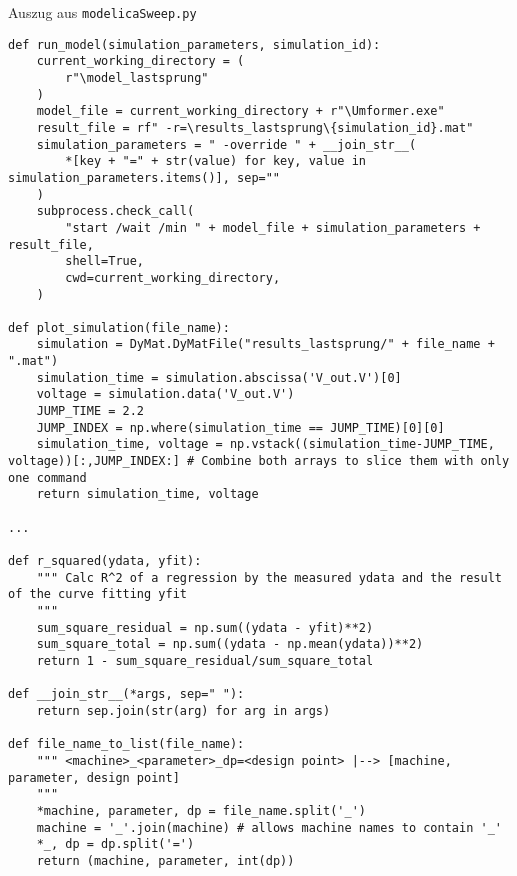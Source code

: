 \begingroup
\captionsetup{type=listing}
\caption{Auszug aus \texttt{modelicaSweep.py}\label{lst:ModelicaSweep}}
\begin{verbatim}
def run_model(simulation_parameters, simulation_id):
    current_working_directory = (
        r"\model_lastsprung"
    )
    model_file = current_working_directory + r"\Umformer.exe"
    result_file = rf" -r=\results_lastsprung\{simulation_id}.mat"
    simulation_parameters = " -override " + __join_str__(
        *[key + "=" + str(value) for key, value in simulation_parameters.items()], sep=""
    )
    subprocess.check_call(
        "start /wait /min " + model_file + simulation_parameters + result_file,
        shell=True,
        cwd=current_working_directory,
    )

def plot_simulation(file_name):
    simulation = DyMat.DyMatFile("results_lastsprung/" + file_name + ".mat")
    simulation_time = simulation.abscissa('V_out.V')[0]
    voltage = simulation.data('V_out.V')
    JUMP_TIME = 2.2
    JUMP_INDEX = np.where(simulation_time == JUMP_TIME)[0][0]
    simulation_time, voltage = np.vstack((simulation_time-JUMP_TIME, voltage))[:,JUMP_INDEX:] # Combine both arrays to slice them with only one command
    return simulation_time, voltage

...
    
def r_squared(ydata, yfit):
    """ Calc R^2 of a regression by the measured ydata and the result of the curve fitting yfit
    """
    sum_square_residual = np.sum((ydata - yfit)**2)
    sum_square_total = np.sum((ydata - np.mean(ydata))**2)
    return 1 - sum_square_residual/sum_square_total

def __join_str__(*args, sep=" "):
    return sep.join(str(arg) for arg in args)

def file_name_to_list(file_name):
    """ <machine>_<parameter>_dp=<design point> |--> [machine, parameter, design point]
    """
    *machine, parameter, dp = file_name.split('_')
    machine = '_'.join(machine) # allows machine names to contain '_'
    *_, dp = dp.split('=')
    return (machine, parameter, int(dp))
\end{verbatim}
\endgroup

